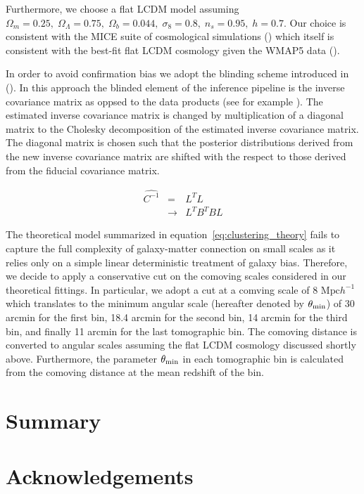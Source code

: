 \documentclass[fleqn,usenatbib,useAMS]{mnras}
\begin{document}
Furthermore, we choose a flat LCDM model assuming $\Omega_m = 0.25, \;\Omega_{\Lambda} = 0.75, \; \Omega_b = 0.044, \; \sigma_{8} = 0.8, \; n_s = 0.95, \; h = 0.7$. Our choice is consistent with the MICE suite of cosmological simulations (\citealt{MICE1}) which itself is consistent with the best-fit flat LCDM cosmology given the WMAP5 data (\citealt{WMAP5}). 

In order to avoid confirmation bias we adopt the blinding scheme introduced in (\citealt{sellentin2019}). In this approach the blinded element of the inference pipeline is the inverse covariance matrix as oppsed to the data products (see for example \citealt{hendrick2017, hendrik2018}). The estimated inverse covariance matrix is changed by multiplication of a diagonal matrix to the Cholesky decomposition of the estimated inverse covariance matrix. The diagonal matrix is chosen such that the posterior distributions derived from the new inverse covariance matrix are shifted with the respect to those derived from the fiducial covariance matrix. 

\begin{eqnarray}
\hat{C^{-1}} &=& L^{T}L \\
             &\rightarrow& L^{T}B^{T}BL
\end{eqnarray}

The theoretical model summarized in equation~\ref{eq:clustering_theory} fails to capture the full complexity of galaxy-matter connection on small scales as it relies only on a simple linear deterministic treatment of galaxy bias. Therefore, we decide to apply a conservative cut on the comoving scales considered in our theoretical fittings. In particular, we adopt a cut at a comving scale of 8 $\mathrm{Mpc}h^{-1}$ which translates to the minimum angular scale (hereafter denoted by $\theta_{\rm min}$) of 30 arcmin for the first bin, 18.4 arcmin for the second bin, 14 arcmin for the third bin, and finally 11 arcmin for the last tomographic bin. The comoving distance is converted to angular scales assuming the flat LCDM cosmology discussed shortly above. Furthermore, the parameter $\theta_{\rm min}$ in each tomographic bin is calculated from the comoving distance at the mean redshift of the bin.


\section{Summary}\label{sec:summary} 


\section*{Acknowledgements}
\end{document}
